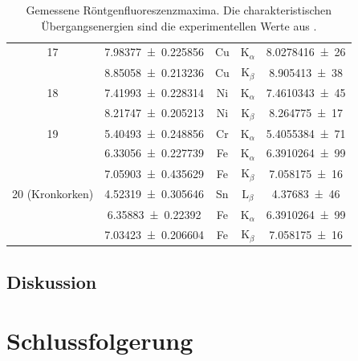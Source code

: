 \documentclass[
	a4paper,
	12pt,
	pagesize,
	ngerman
]{scrartcl}
\begin{document}
\begin{table}[H]
{\begin{tabular}{ c | c || c | c | c }
			17 & \SI{7.98377+-0.225856}{} & Cu & $\text{K}_\alpha$ & \SI{8,0278416(26)}{} \\
			& \SI{8.85058+-0.213236}{} & Cu & $\text{K}_\beta$ & \SI{8,905413(38)}{} \\ \hline
			
			18 & \SI{7.41993+-0.228314}{} & Ni & $\text{K}_\alpha$ & \SI{7,4610343(45)}{} \\
			& \SI{8.21747+-0.205213}{} & Ni & $\text{K}_\beta$ &   \SI{8,264775(17)}{} \\ \hline
			
			19 & \SI{5.40493+-0.248856}{} & Cr & $\text{K}_\alpha$ & \SI{5,4055384(71)}{} \\
			& \SI{6.33056+-0.227739}{} & Fe & $\text{K}_\alpha$ & \SI{ 6,3910264(99)}{} \\
			& \SI{7.05903+-0.435629}{} & Fe &  $\text{K}_\beta $ & \SI{7,058175(16)}{} \\ \hline
			
			20 (Kronkorken) & \SI{4.52319+-0.305646}{} & Sn & $\text{L}_\beta $ &  \SI{4,37683(46)}{} \\ %
			& \SI{6.35883+-0.22392}{} & Fe & $\text{K}_\alpha $ &  \SI{6,3910264(99)}{} \\
			& \SI{7.03423+-0.206604}{} & Fe & $\text{K}_\beta $ &  \SI{7,058175(16)}{} \\ \hline
		\end{tabular}
		}
		\caption{Gemessene Röntgenfluoreszenzmaxima. Die charakteristischen Übergangsenergien sind die experimentellen Werte aus \cite{XRAYDB}.} %
		\label{tb_peaks_unknown} 
		
	\end{table}
	
	\subsection{Diskussion}
	
	
	\section{Schlussfolgerung}
	
	
	\printbibliography
\end{document}
